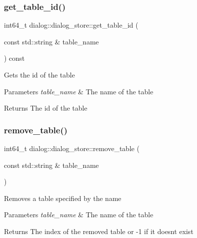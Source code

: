 \subsubsection{\texorpdfstring{get\+\_\+table\+\_\+id()}{get\_table\_id()}}
{\footnotesize\ttfamily int64\+\_\+t dialog\+::dialog\+\_\+store\+::get\+\_\+table\+\_\+id (\begin{DoxyParamCaption}\item[{const std\+::string \&}]{table\+\_\+name }\end{DoxyParamCaption}) const\hspace{0.3cm}{\ttfamily [inline]}}

Gets the id of the table 
\begin{DoxyParams}{Parameters}
{\em table\+\_\+name} & The name of the table \\
\hline
\end{DoxyParams}
\begin{DoxyReturn}{Returns}
The id of the table 
\end{DoxyReturn}
\mbox{\label{classdialog_1_1dialog__store_a15b6b065d529ede947ff3ca4db77ab56}} 
\subsubsection{\texorpdfstring{remove\+\_\+table()}{remove\_table()}\hspace{0.1cm}{\footnotesize\ttfamily [1/2]}}
{\footnotesize\ttfamily int64\+\_\+t dialog\+::dialog\+\_\+store\+::remove\+\_\+table (\begin{DoxyParamCaption}\item[{const std\+::string \&}]{table\+\_\+name }\end{DoxyParamCaption})\hspace{0.3cm}{\ttfamily [inline]}}

Removes a table specified by the name 
\begin{DoxyParams}{Parameters}
{\em table\+\_\+name} & The name of the table \\
\hline
\end{DoxyParams}
\begin{DoxyReturn}{Returns}
The index of the removed table or -\/1 if it doesn\textquotesingle{}t exist 
\end{DoxyReturn}
\mbox{\label{classdialog_1_1dialog__store_a7557cfcb6f7f5458031b7b3971d9d7cd}} 
